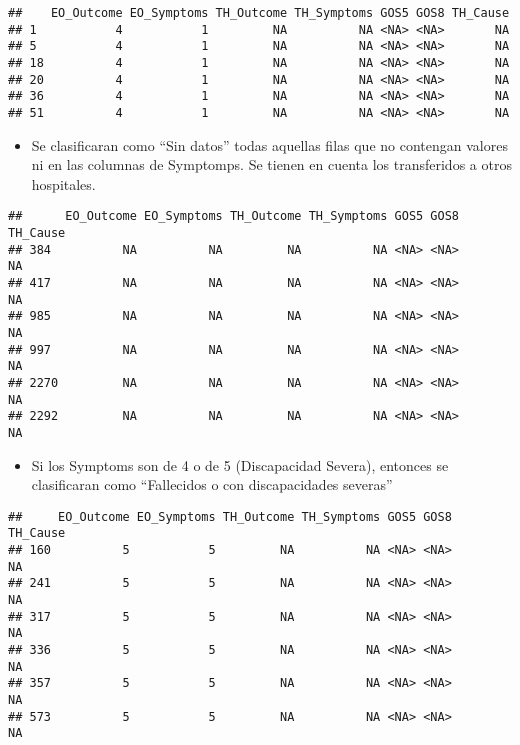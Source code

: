\documentclass[]{article}
\providecommand{\tightlist}{%
  \setlength{\itemsep}{0pt}\setlength{\parskip}{0pt}}
\begin{document}
\begin{verbatim}
##    EO_Outcome EO_Symptoms TH_Outcome TH_Symptoms GOS5 GOS8 TH_Cause
## 1           4           1         NA          NA <NA> <NA>       NA
## 5           4           1         NA          NA <NA> <NA>       NA
## 18          4           1         NA          NA <NA> <NA>       NA
## 20          4           1         NA          NA <NA> <NA>       NA
## 36          4           1         NA          NA <NA> <NA>       NA
## 51          4           1         NA          NA <NA> <NA>       NA
\end{verbatim}

\begin{itemize}
\tightlist
\item
  Se clasificaran como ``Sin datos'' todas aquellas filas que no
  contengan valores ni en las columnas de Symptomps. Se tienen en cuenta
  los transferidos a otros hospitales.
\end{itemize}

\begin{verbatim}
##      EO_Outcome EO_Symptoms TH_Outcome TH_Symptoms GOS5 GOS8 TH_Cause
## 384          NA          NA         NA          NA <NA> <NA>       NA
## 417          NA          NA         NA          NA <NA> <NA>       NA
## 985          NA          NA         NA          NA <NA> <NA>       NA
## 997          NA          NA         NA          NA <NA> <NA>       NA
## 2270         NA          NA         NA          NA <NA> <NA>       NA
## 2292         NA          NA         NA          NA <NA> <NA>       NA
\end{verbatim}

\begin{itemize}
\tightlist
\item
  Si los Symptoms son de 4 o de 5 (Discapacidad Severa), entonces se
  clasificaran como ``Fallecidos o con discapacidades severas''
\end{itemize}

\begin{verbatim}
##     EO_Outcome EO_Symptoms TH_Outcome TH_Symptoms GOS5 GOS8 TH_Cause
## 160          5           5         NA          NA <NA> <NA>       NA
## 241          5           5         NA          NA <NA> <NA>       NA
## 317          5           5         NA          NA <NA> <NA>       NA
## 336          5           5         NA          NA <NA> <NA>       NA
## 357          5           5         NA          NA <NA> <NA>       NA
## 573          5           5         NA          NA <NA> <NA>       NA
\end{verbatim}
\end{document}
